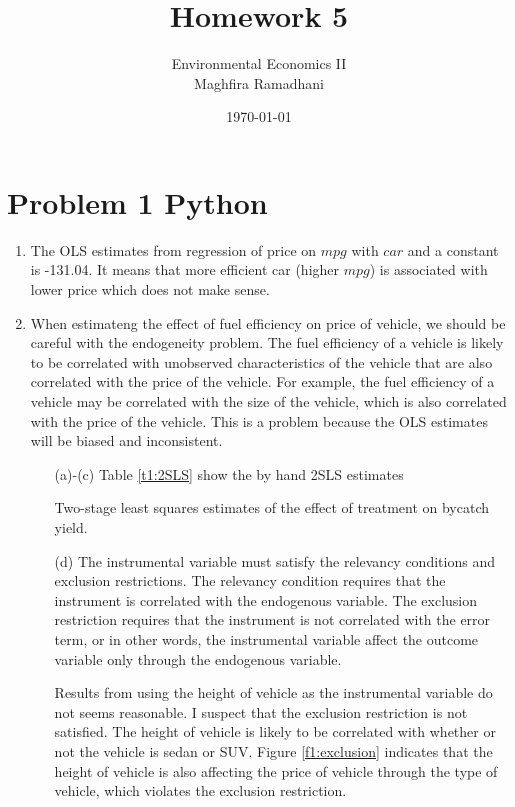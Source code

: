 \documentclass{article}
\begin{document}
 
\title{Homework 5}
\author{Environmental Economics II\\
Maghfira Ramadhani}
\date{\today}
\maketitle

\section*{Problem 1 Python}
\begin{enumerate}
\item The OLS estimates from regression of price on $mpg$ with $car$ and a constant is -131.04. It means that more efficient car (higher $mpg$) is associated with lower price which does not make sense.
\item When estimateng the effect of fuel efficiency on price of vehicle, we should be careful with the endogeneity problem. The fuel efficiency of a vehicle is likely to be correlated with unobserved characteristics of the vehicle that are also correlated with the price of the vehicle. For example, the fuel efficiency of a vehicle may be correlated with the size of the vehicle, which is also correlated with the price of the vehicle. This is a problem because the OLS estimates will be biased and inconsistent.
\begin{enumerate}
    \item[(a)-(c)] Table \ref{t1:2SLS} show the by hand 2SLS estimates
    \begin{table}[H]\centering
    \caption{Two-stage least squares estimates of the effect of treatment on bycatch yield.}
    \label{t1:2SLS}
    \begin{threeparttable}
    
    \end{threeparttable}
    \end{table}
    
    \item[(d)] The instrumental variable must satisfy the relevancy conditions and exclusion restrictions. The relevancy condition requires that the instrument is correlated with the endogenous variable. The exclusion restriction requires that the instrument is not correlated with the error term, or in other words, the instrumental variable affect the outcome variable only through the endogenous variable. 
    
    Results from using the height of vehicle as the instrumental variable do not seems reasonable. I suspect that the exclusion restriction is not satisfied. The height of vehicle is likely to be correlated with whether or not the vehicle is sedan or SUV. Figure \ref{f1:exclusion} indicates that the height of vehicle is also affecting the price of vehicle through the type of vehicle, which violates the exclusion restriction.


\end{enumerate}
\end{enumerate}
\end{document}
